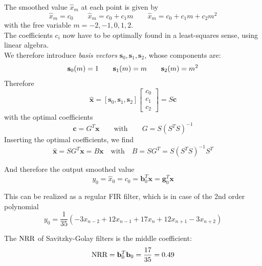 The smoothed value $\hat{x}_m$ at each point is given by
\begin{equation*}
	\hat{x}_m = c_0 \qquad \hat{x}_m = c_0 + c_1 m \qquad \hat{x}_m = c_0 + c_1 m + c_2 m^2
\end{equation*}
with the free variable $m = -2,-1,0,1,2$. \\

The coefficients $c_i$ now have to be
optimally found in a least-squares sense, using linear algebra. \\

We  therefore introduce \emph{basis vectors} 
$\mathbf{s}_0, \mathbf{s}_1, \mathbf{s}_2$, whose components are:
\begin{equation*}
	\mathbf{s}_0(m) = 1 \qquad \mathbf{s}_1(m) = m \qquad \mathbf{s}_2(m) = m^2 \\
\end{equation*}
Therefore
\begin{equation*}
	\hat{\mathbf{x}} = \left[\mathbf{s}_0,\mathbf{s}_1,\mathbf{s}_2\right] 
	\begin{bmatrix}c_0\\c_1\\c_2\end{bmatrix} = S\mathbf{c}
\end{equation*}
with the optimal coefficients
\begin{equation*}
	\mathbf{c} = G^T \mathbf{x} \qquad \text{with} \qquad G = S \left(S^T S \right)^{-1}
\end{equation*}
Inserting the optimal coefficients, we find
\begin{equation*}
	\hat{\mathbf{x}} = S G^T \mathbf{x} = B \mathbf{x} \quad \text{with} \quad B = S G^T = S \left(S^T S\right)^{-1} S^T
\end{equation*}

And therefore the output smoothed value
\begin{equation*}
	y_0 = \hat{x}_0 = c_0 = \mathbf{b}_0^T \mathbf{x} = \mathbf{g}_0^T \mathbf{x}
\end{equation*}

This can be realized as a regular FIR filter, which is in case of the 2nd order
polynomial
\begin{equation*}
	y_0 = \frac{1}{35} \left( -3 x_{n-2} + 12 x_{n-1} + 17 x_n + 12 x_{n+1} - 3 x_{n+2}\right)
\end{equation*}

The $\operatorname{\text{NRR}}$ of Savitzky-Golay filters is the middle coefficient:
\begin{equation*}
	\operatorname{\text{NRR}} = \mathbf{b}_0^T \mathbf{b}_0 = \frac{17}{35} = 0.49
\end{equation*}

